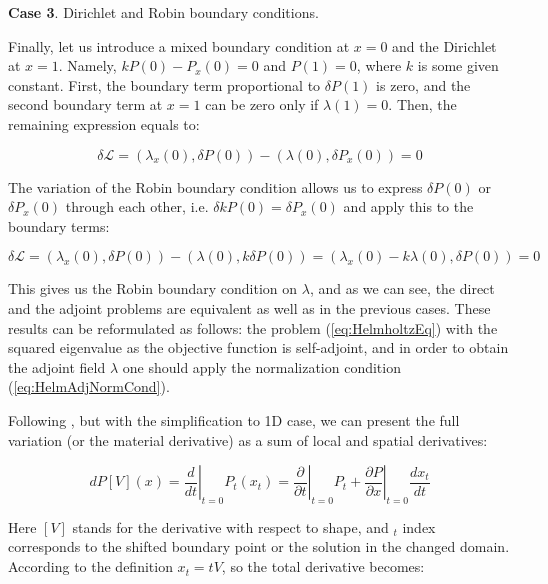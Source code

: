 \textbf{Case 3}. Dirichlet and Robin boundary conditions.

Finally, let us introduce a mixed boundary condition at $x = 0$ and the Dirichlet at $x = 1$. Namely, $k P(0) - P_x (0) = 0$ and $P(1) = 0$, where $k$ is some given constant. First, the boundary term proportional to $\delta P(1)$ is zero, and the second boundary term at $x=1$ can be zero only if $\lambda(1) = 0$. Then, the remaining expression equals to:

\begin{equation}
    \delta \mathcal{L} = \left( \lambda_x(0) , \delta P(0) \right) - \left( \lambda(0) , \delta P_x (0) \right)  = 0
\end{equation}

The variation of the Robin boundary condition allows us to express $\delta P(0)$ or $\delta P_x(0)$ through each other, i.e. $\delta k P(0) = \delta P_x(0)$ and apply this to the boundary terms:

\begin{equation}
    \delta \mathcal{L} = \left( \lambda_x(0) , \delta P(0) \right) - \left( \lambda(0) , k \delta P (0) \right)  = \left( \lambda_x(0) - k \lambda(0) , \delta P (0) \right) = 0
\end{equation}

This gives us the Robin boundary condition on $\lambda$, and as we can see, the direct and the adjoint problems are equivalent as well as in the previous cases. These results can be reformulated as follows: the problem (\ref{eq:HelmholtzEq}) with the squared eigenvalue as the objective function is self-adjoint, and in order to obtain the adjoint field $\lambda$ one should apply the normalization condition (\ref{eq:HelmAdjNormCond}).

Following \cite{Schmidt2010}, but with the simplification to 1D case, we can present the full variation (or the material derivative) as a sum of local and spatial derivatives:

\begin{equation}
    dP[V](x) = \left.\frac{d}{dt} \right\rvert_{t=0} P_t (x_t) = \left.\frac{\partial}{\partial t}\right\rvert_{t=0} P_t + \left.\frac{\partial P}{\partial x}\right\rvert_{t=0} \frac{d x_t}{d t}
\end{equation}

Here $[V]$ stands for the derivative with respect to shape, and $_t$ index corresponds to the shifted boundary point or the solution in the changed domain. According to the definition $x_t = tV$, so the total derivative becomes:

